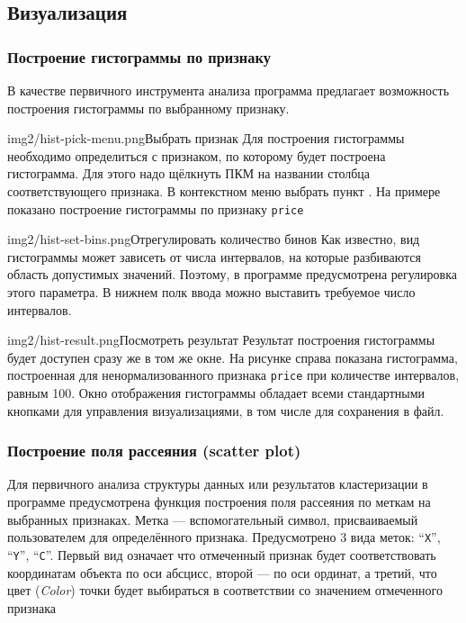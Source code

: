 \documentclass[12pt,tikz]{instruction}
\begin{document}
\newpage
\subsection{Визуализация}
\subsubsection{Построение гистограммы по признаку }
\label{subsubsec:hist}

В качестве первичного инструмента анализа программа предлагает возможность построения гистограммы по выбранному признаку.

\begin{steps}
	\begin{ist}{img2/hist-pick-menu.png}{Выбрать признак}
		Для построения гистограммы необходимо определиться с признаком, по которому будет построена гистограмма. Для этого надо щёлкнуть ПКМ на названии столбца соответствующего признака. В контекстном меню выбрать пункт . На примере показано построение гистограммы по признаку \texttt{price}
	\end{ist}
	\begin{ist}{img2/hist-set-bins.png}{Отрегулировать количество бинов}
		Как известно, вид гистограммы может зависеть от числа интервалов, на которые разбиваются область допустимых значений. Поэтому, в программе предусмотрена регулировка этого параметра. В нижнем полк ввода можно выставить требуемое число интервалов.
	\end{ist}
	\begin{ist}{img2/hist-result.png}{Посмотреть результат}
		Результат построения гистограммы будет доступен сразу же в том же окне. На рисунке справа показана гистограмма, построенная для ненормализованного признака \texttt{price} при количестве интервалов, равным 100. Окно отображения гистограммы обладает всеми стандартными кнопками для управления визуализациями, в том числе для сохранения в файл.
	\end{ist}		
\end{steps}	


\newpage
\subsubsection{Построение поля рассеяния (scatter plot)}
\label{subsubsec:scatterplot}

Для первичного анализа структуры данных или результатов кластеризации в программе предусмотрена функция построения поля рассеяния по меткам на выбранных признаках. Метка --- вспомогательный символ, присваиваемый пользователем для  определённого признака.  Предусмотрено 3 вида меток: ``\texttt{X}'', ``\texttt{Y}'', ``\texttt{C}''. Первый вид означает что отмеченный признак будет соответствовать координатам объекта по оси абсцисс, второй --- по оси ординат, а третий, что цвет (\textit{Color}) точки будет выбираться в соответствии со значением отмеченного признака
\end{document}
